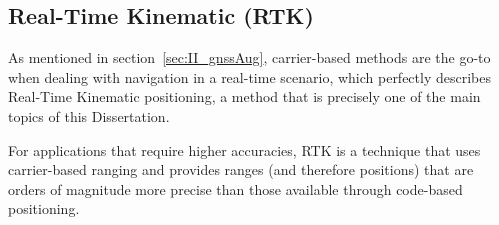 


\subsection{Real-Time Kinematic (RTK)}\label{sec:II_gnssAug_rtk}

As mentioned in section~\ref{sec:II_gnssAug}, carrier-based methods are the go-to when dealing with navigation in a real-time scenario, which perfectly describes Real-Time Kinematic positioning, a method that is precisely one of the main topics of this Dissertation.

For applications that require higher accuracies, RTK is a technique that uses carrier-based ranging and provides ranges (and therefore positions) that are orders of magnitude more precise than those available through code-based positioning. %


